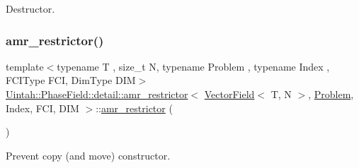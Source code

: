 Destructor. 

\mbox{\label{classUintah_1_1PhaseField_1_1detail_1_1amr__restrictor_3_01VectorField_3_01T_00_01N_01_4_00_01Pre7f2e99a4fbf25ff00717d25c8580b1a_a58c616d121749519316e5241271e618a}} 
\subsubsection{\texorpdfstring{amr\+\_\+restrictor()}{amr\_restrictor()}\hspace{0.1cm}{\footnotesize\ttfamily [3/3]}}
{\footnotesize\ttfamily template$<$typename T , size\+\_\+t N, typename Problem , typename Index , F\+C\+I\+Type F\+CI, Dim\+Type D\+IM$>$ \\
\hyperlink{classUintah_1_1PhaseField_1_1detail_1_1amr__restrictor}{Uintah\+::\+Phase\+Field\+::detail\+::amr\+\_\+restrictor}$<$ \hyperlink{structUintah_1_1PhaseField_1_1VectorField}{Vector\+Field}$<$ T, N $>$, \hyperlink{classUintah_1_1PhaseField_1_1Problem}{Problem}, Index, F\+CI, D\+IM $>$\+::\hyperlink{classUintah_1_1PhaseField_1_1detail_1_1amr__restrictor}{amr\+\_\+restrictor} (\begin{DoxyParamCaption}\item[{const \hyperlink{classUintah_1_1PhaseField_1_1detail_1_1amr__restrictor}{amr\+\_\+restrictor}$<$ \hyperlink{structUintah_1_1PhaseField_1_1VectorField}{Vector\+Field}$<$ T, N $>$, \hyperlink{classUintah_1_1PhaseField_1_1Problem}{Problem}, Index, F\+CI, D\+IM $>$ \&}]{ }\end{DoxyParamCaption})\hspace{0.3cm}{\ttfamily [delete]}}



Prevent copy (and move) constructor. 



